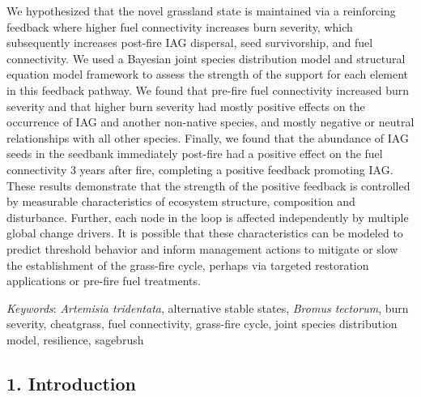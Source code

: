 \documentclass[
  12pt,
]{article}
\begin{document}
We hypothesized that the novel grassland state is maintained via a
reinforcing feedback where higher fuel connectivity increases burn
severity, which subsequently increases post-fire IAG dispersal, seed
survivorship, and fuel connectivity. We used a Bayesian joint species
distribution model and structural equation model framework to assess the
strength of the support for each element in this feedback pathway. We
found that pre-fire fuel connectivity increased burn severity and that
higher burn severity had mostly positive effects on the occurrence of
IAG and another non-native species, and mostly negative or neutral
relationships with all other species. Finally, we found that the
abundance of IAG seeds in the seedbank immediately post-fire had a
positive effect on the fuel connectivity 3 years after fire, completing
a positive feedback promoting IAG. These results demonstrate that the
strength of the positive feedback is controlled by measurable
characteristics of ecosystem structure, composition and disturbance.
Further, each node in the loop is affected independently by multiple
global change drivers. It is possible that these characteristics can be
modeled to predict threshold behavior and inform management actions to
mitigate or slow the establishment of the grass-fire cycle, perhaps via
targeted restoration applications or pre-fire fuel treatments.

\emph{Keywords}: \emph{Artemisia tridentata}, alternative stable states,
\emph{Bromus tectorum}, burn severity, cheatgrass, fuel connectivity,
grass-fire cycle, joint species distribution model, resilience,
sagebrush

\hypertarget{introduction}{%
\subsection{1. Introduction}\label{introduction}}
\end{document}
